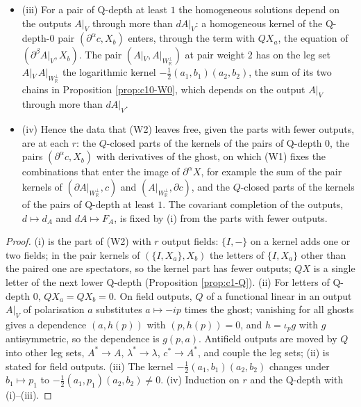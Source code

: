 \begin{proposition}
\begin{itemize}
\item (iii) For a pair of Q-depth at least $1$ the homogeneous solutions depend on the outputs $A|_V$ through more than $dA|_V$: a homogeneous kernel of the Q-depth-$0$ pair $(\partial^\alpha c,X_b)$ enters, through the term with $QX_a$, the equation of $(\partial^\beta A|_V,X_b)$. The pair $(A|_V,A|_{W_{\mathbb R}^\perp})$ at pair weight $2$ has on the leg set $A|_V\,A|_{W_{\mathbb R}^\perp}$ the logarithmic kernel $-\tfrac12(a_1,b_1)(a_2,b_2)$, the sum of its two chains in Proposition \ref{prop:c10-W0}, which depends on the output $A|_V$ through more than $dA|_V$.
\item (iv) Hence the data that (W2) leaves free, given the parts with fewer outputs, are at each $r$: the $Q$-closed parts of the kernels of the pairs of Q-depth $0$, the pairs $(\partial^\alpha c,X_b)$ with derivatives of the ghost, on which (W1) fixes the combinations that enter the image of $\partial^\alpha X$, for example the sum of the pair kernels of $(\partial A|_{W_{\mathbb R}^\perp},c)$ and $(A|_{W_{\mathbb R}^\perp},\partial c)$, and the $Q$-closed parts of the kernels of the pairs of Q-depth at least $1$. The covariant completion of the outputs, $d\mapsto d_A$ and $dA\mapsto F_A$, is fixed by (i) from the parts with fewer outputs.
\end{itemize}
\end{proposition}

\begin{proof}
(i) is the part of (W2) with $r$ output fields: $\{I,-\}$ on a kernel adds one or two fields; in the pair kernels of $(\{I,X_a\},X_b)$ the letters of $\{I,X_a\}$ other than the paired one are spectators, so the kernel part has fewer outputs; $QX$ is a single letter of the next lower Q-depth (Proposition \ref{prop:c1-Q}). (ii) For letters of Q-depth $0$, $QX_a=QX_b=0$. On field outputs, $Q$ of a functional linear in an output $A|_V$ of polarisation $a$ substitutes $a\mapsto-ip$ times the ghost; vanishing for all ghosts gives a dependence $(a,h(p))$ with $(p,h(p))=0$, and $h=\iota_pg$ with $g$ antisymmetric, so the dependence is $g(p,a)$. Antifield outputs are moved by $Q$ into other leg sets, $A^*\to A$, $\lambda^*\to\lambda$, $c^*\to A^*$, and couple the leg sets; (ii) is stated for field outputs. (iii) The kernel $-\tfrac12(a_1,b_1)(a_2,b_2)$ changes under $b_1\mapsto p_1$ to $-\tfrac12(a_1,p_1)(a_2,b_2)\neq0$. (iv) Induction on $r$ and the Q-depth with (i)--(iii).
\end{proof}

